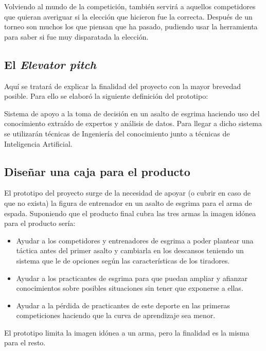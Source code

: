 Volviendo al mundo de la competición, también servirá a aquellos competidores que quieran
averiguar si la elección que hicieron fue la correcta. Después de un torneo son muchos
los que piensan que ha pasado, pudiendo usar la herramienta para saber si fue muy
disparatada la elección.

\subsection{El \textit{Elevator pitch}}
Aquí se tratará de explicar la finalidad del proyecto con la mayor brevedad posible. Para ello
se elaboró la siguiente definición del prototipo:

Sistema de apoyo a la toma de decisión en un asalto de esgrima haciendo uso del
conocimiento extraído de expertos y análisis de datos. Para llegar a dicho sistema
se utilizarán técnicas de Ingeniería del conocimiento junto a técnicas de Inteligencia
Artificial.

\subsection{Diseñar una caja para el producto}
El prototipo del proyecto surge de la necesidad de apoyar (o cubrir en caso de que no exista)
la figura de entrenador en un asalto de esgrima para el arma de espada. Suponiendo que el
producto final cubra las tres armas la imagen idónea para el producto sería:

\begin{itemize}
  \item Ayudar a los competidores y entrenadores de esgrima a poder plantear una táctica antes
    del primer asalto y cambiarla en los descansos teniendo un sistema
    que le de opciones según las características de los tiradores.
  \item Ayudar a los practicantes de esgrima para que puedan ampliar y afianzar conocimientos
    sobre posibles situaciones sin tener que exponerse a ellas.
  \item Ayudar a la pérdida de practicantes de este deporte en las primeras competiciones haciendo
    que la curva de aprendizaje sea menor.
\end{itemize}

El prototipo limita la imagen idónea a un arma, pero la finalidad es la misma para el resto.
